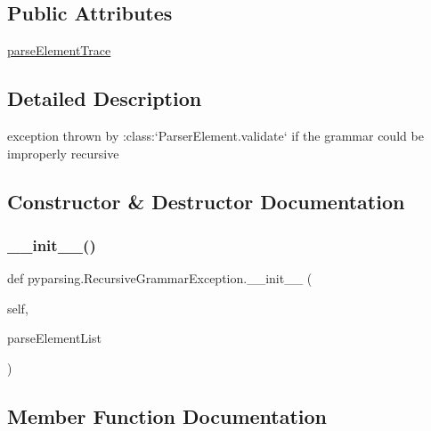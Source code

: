 \subsection*{Public Attributes}
\begin{DoxyCompactItemize}
\item 
\hyperlink{classpyparsing_1_1RecursiveGrammarException_a0bd6b62f17892552bac58a1413211d5f}{parse\+Element\+Trace}
\end{DoxyCompactItemize}


\subsection{Detailed Description}
\begin{DoxyVerb}exception thrown by :class:`ParserElement.validate` if the
grammar could be improperly recursive
\end{DoxyVerb}
 

\subsection{Constructor \& Destructor Documentation}
\mbox{\label{classpyparsing_1_1RecursiveGrammarException_ae549d108f5cf932817b7ed21c44db452}} 
\subsubsection{\texorpdfstring{\+\_\+\+\_\+init\+\_\+\+\_\+()}{\_\_init\_\_()}}
{\footnotesize\ttfamily def pyparsing.\+Recursive\+Grammar\+Exception.\+\_\+\+\_\+init\+\_\+\+\_\+ (\begin{DoxyParamCaption}\item[{}]{self,  }\item[{}]{parse\+Element\+List }\end{DoxyParamCaption})}



\subsection{Member Function Documentation}
\mbox{\label{classpyparsing_1_1RecursiveGrammarException_a0285ae60e5ee40ac49a13dae0093a07c}} 
